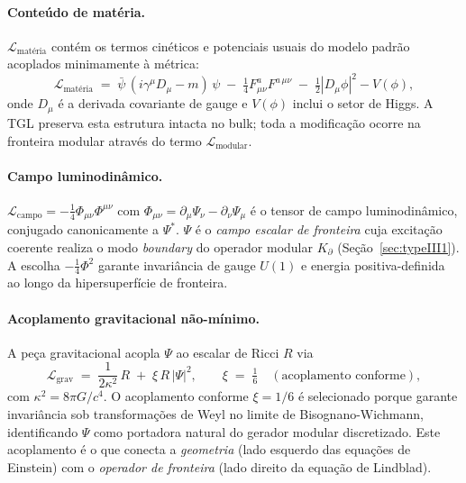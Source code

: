 \documentclass[12pt,a4paper]{article}
\newcommand{\Kpartial}{K_{\partial}}
\newcommand{\TGL}{\textsc{TGL}}
\begin{document}
\paragraph{Conteúdo de matéria.}
$\mathcal{L}_{\text{matéria}}$ contém os termos cinéticos e potenciais usuais
do modelo padrão acoplados minimamente à métrica:
\begin{equation}
\mathcal{L}_{\text{matéria}} \;=\; \bar{\psi}\,(i\gamma^{\mu}D_{\mu} - m)\,\psi
\;-\; \tfrac{1}{4}F_{\mu\nu}^{a} F^{a\,\mu\nu}
\;-\; \tfrac{1}{2}|D_{\mu}\phi|^{2} - V(\phi),
\end{equation}
onde $D_{\mu}$ é a derivada covariante de gauge e $V(\phi)$ inclui o setor de
Higgs.  A \TGL{} preserva esta estrutura intacta no bulk; toda a modificação
ocorre na fronteira modular através do termo $\mathcal{L}_{\text{modular}}$.

\paragraph{Campo luminodinâmico.}
$\mathcal{L}_{\text{campo}} = -\tfrac{1}{4}\Phi_{\mu\nu}\Phi^{\mu\nu}$ com
$\Phi_{\mu\nu} = \partial_{\mu}\Psi_{\nu} - \partial_{\nu}\Psi_{\mu}$ é o tensor
de campo luminodinâmico, conjugado canonicamente a $\Psi^{*}$.  $\Psi$ é o
\emph{campo escalar de fronteira} cuja excitação coerente realiza o modo
\emph{boundary} do operador modular $\Kpartial$ (Seção~\ref{sec:typeIII1}).
A escolha $-\tfrac{1}{4}\Phi^{2}$ garante invariância de gauge $U(1)$ e
energia positiva-definida ao longo da hipersuperfície de fronteira.

\paragraph{Acoplamento gravitacional não-mínimo.}
A peça gravitacional acopla $\Psi$ ao escalar de Ricci $R$ via
\begin{equation}
\mathcal{L}_{\text{grav}} \;=\; \frac{1}{2\kappa^{2}}\,R
\;+\; \xi \, R \, |\Psi|^{2},
\qquad
\xi \;=\; \tfrac{1}{6} \quad (\text{acoplamento conforme}),
\end{equation}
com $\kappa^{2} = 8\pi G/c^{4}$.  O acoplamento conforme $\xi = 1/6$ é
selecionado porque garante invariância sob transformações de Weyl no limite
de Bisognano-Wichmann, identificando $\Psi$ como portadora natural do
gerador modular discretizado.  Este acoplamento é o que conecta a
\emph{geometria} (lado esquerdo das equações de Einstein) com o
\emph{operador de fronteira} (lado direito da equação de Lindblad).
\end{document}
